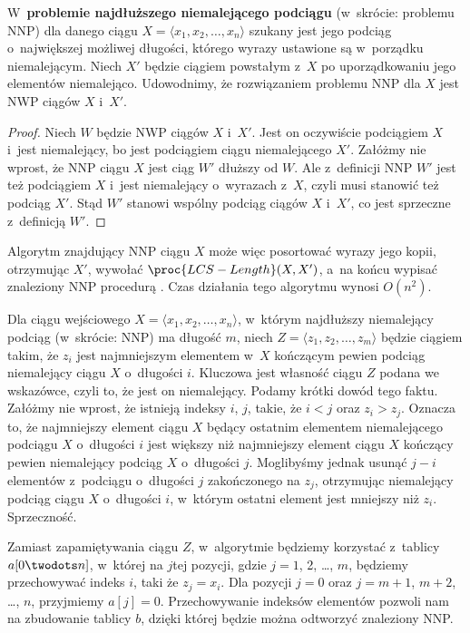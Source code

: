 \exercise %
W~\textbf{problemie najdłuższego niemalejącego podciągu} (w~skrócie: problemu NNP) dla danego ciągu $X=\langle x_1,x_2,\dots,x_n\rangle$ szukany jest jego podciąg o~największej możliwej długości, którego wyrazy ustawione są w~porządku niemalejącym.
Niech $X'$ będzie ciągiem powstałym z~$X$ po uporządkowaniu jego elementów niemalejąco.
Udowodnimy, że rozwiązaniem problemu NNP dla $X$ jest NWP ciągów $X$ i~$X'$.

\begin{proof}
Niech $W$ będzie NWP ciągów $X$ i~$X'$.
Jest on oczywiście podciągiem $X$ i~jest niemalejący, bo jest podciągiem ciągu niemalejącego $X'$.
Załóżmy nie wprost, że NNP ciągu $X$ jest ciąg $W'$ dłuższy od $W$.
Ale z~definicji NNP $W'$ jest też podciągiem $X$ i~jest niemalejący o~wyrazach z~$X$, czyli musi stanowić też podciąg $X'$.
Stąd $W'$ stanowi wspólny podciąg ciągów $X$ i~$X'$, co jest sprzeczne z~definicją $W'$.
\end{proof}

Algorytm znajdujący NNP ciągu $X$ może więc posortować wyrazy jego kopii, otrzymując $X'$, wywołać $\proc{LCS-Length}(X,X')$, a~na końcu wypisać znaleziony NNP procedurą .
Czas działania tego algorytmu wynosi $O(n^2)$.

\exercise %
Dla ciągu wejściowego $X=\langle x_1,x_2,\dots,x_n\rangle$, w~którym najdłuższy niemalejący podciąg (w~skrócie: NNP) ma długość $m$, niech $Z=\langle z_1,z_2,\dots,z_m\rangle$ będzie ciągiem takim, że $z_i$ jest najmniejszym elementem w~$X$ kończącym pewien podciąg niemalejący ciągu $X$ o~długości $i$.
Kluczowa jest własność ciągu $Z$ podana we wskazówce, czyli to, że jest on niemalejący.
Podamy krótki dowód tego faktu.
Załóżmy nie wprost, że istnieją indeksy $i$, $j$, takie, że $i<j$ oraz $z_i>z_j$.
Oznacza to, że najmniejszy element ciągu $X$ będący ostatnim elementem niemalejącego podciągu $X$ o~długości $i$ jest większy niż najmniejszy element ciągu $X$ kończący pewien niemalejący podciąg $X$ o~długości $j$.
Moglibyśmy jednak usunąć $j-i$ elementów z~podciągu o~długości $j$ zakończonego na $z_j$, otrzymując niemalejący podciąg ciągu $X$ o~długości $i$, w~którym ostatni element jest mniejszy niż $z_i$.
Sprzeczność.

Zamiast zapamiętywania ciągu $Z$, w~algorytmie będziemy korzystać z~tablicy $a[0\twodots n]$, w~której na $j$\nbhyphen tej pozycji, gdzie $j=1$, 2, \dots, $m$, będziemy przechowywać indeks $i$, taki że $z_j=x_i$.
Dla pozycji $j=0$ oraz $j=m+1$, $m+2$, \dots, $n$, przyjmiemy $a[j]=0$.
Przechowywanie indeksów elementów pozwoli nam na zbudowanie tablicy $b$, dzięki której będzie można odtworzyć znaleziony NNP.


